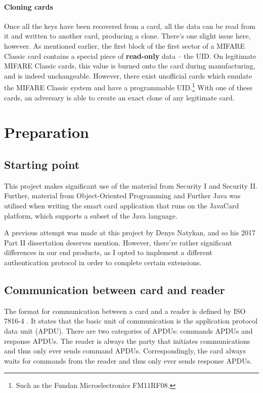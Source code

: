 \documentclass[12pt,a4paper,twoside,openright]{report}
\begin{document}
\subsubsection{Cloning cards}

Once all the keys have been recovered from a card, all the data can be read from it and written to another card, producing a clone. There's one slight issue here, however. As mentioned earlier, the first block of the first sector of a MIFARE Classic card contains a special piece of \textbf{read-only} data -- the UID. On legitimate MIFARE Classic cards, this value is burned onto the card during manufacturing, and is indeed unchangeable. However, there exist unofficial cards which emulate the MIFARE Classic system and have a programmable UID.\footnote{Such as the Fundan Microelectronics FM11RF08.} With one of these cards, an adversary is able to create an exact clone of any legitimate card.

\chapter{Preparation}

\section{Starting point}

This project makes significant use of the material from Security I and Security II. Further, material from Object-Oriented Programming and Further Java was utilised when writing the smart card application that runs on the JavaCard platform, which supports a subset of the Java language.

A previous attempt was made at this project by Denys Natykan, and so his 2017 Part II dissertation deserves mention. However, there're rather significant differences in our end products, as I opted to implement a different authentication protocol in order to complete certain extensions.

\section{Communication between card and reader}

The format for communication between a card and a reader is defined by ISO 7816-4 \cite{ISO78164}. It states that the basic unit of communication is the application protocol data unit (APDU). There are two categories of APDUs: commands APDUs and response APDUs. The reader is always the party that initiates communications and thus only ever sends command APDUs. Correspondingly, the card always waits for commands from the reader and thus only ever sends response APDUs.
\end{document}
